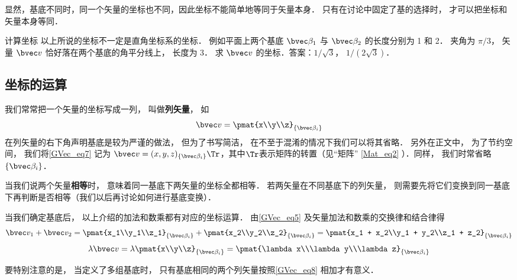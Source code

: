 显然，基底不同时，同一个矢量的坐标也不同，因此坐标不能简单地等同于矢量本身． 只有在讨论中固定了基的选择时， 才可以把坐标和矢量本身等同．

\begin{exercise}{计算坐标}
以上所说的坐标不一定是直角坐标系的坐标． 例如平面上两个基底 $\bvec \beta_1$ 与 $\bvec \beta_2$ 的长度分别为 1 和 2． 夹角为 $\pi/3$， 矢量 $\bvec v$ 恰好落在两个基底的角平分线上， 长度为 3． 求 $\bvec v$ 的坐标．答案：$1/\sqrt 3$， $1/(2\sqrt 3)$．
\end{exercise}

\subsection{坐标的运算}
我们常常把一个矢量的坐标写成一列， 叫做\textbf{列矢量}， 如
\begin{equation}\label{GVec_eq7}
\bvec v = \pmat{x\\y\\z}_{\{\bvec\beta_i\}}
\end{equation}
在列矢量的右下角声明基底是较为严谨的做法， 但为了书写简洁， 在不至于混淆的情况下我们可以将其省略． 另外在正文中， 为了节约空间， 我们将\autoref{GVec_eq7} 记为 $\bvec v = (x, y, z)_{\{\bvec\beta_i\}}\Tr$，其中$\Tr$表示矩阵的转置（见“矩阵” \autoref{Mat_eq2} ）．同样， 我们时常省略 $\{\bvec\beta_i\}$．

当我们说两个矢量\textbf{相等}时， 意味着同一基底下两矢量的坐标全都相等． 若两矢量在不同基底下的列矢量， 则需要先将它们变换到同一基底下再判断是否相等（我们以后再讨论如何进行基底变换）．

当我们确定基底后， 以上介绍的加法和数乘都有对应的坐标运算． 由\autoref{GVec_eq5} 及矢量加法和数乘的交换律和结合律得
\begin{equation}\label{GVec_eq8}
\bvec v_1 + \bvec v_2 = \pmat{x_1\\y_1\\z_1}_{\{\bvec\beta_i\}} + \pmat{x_2\\y_2\\z_2}_{\{\bvec\beta_i\}} = \pmat{x_1 + x_2\\y_1 + y_2\\z_1 + z_2}_{\{\bvec\beta_i\}}
\end{equation}
\begin{equation}\label{GVec_eq9}
\lambda \bvec v = \lambda\pmat{x\\y\\z}_{\{\bvec\beta_i\}} = \pmat{\lambda x\\\lambda y\\\lambda z}_{\{\bvec\beta_i\}}
\end{equation}

要特别注意的是， 当定义了多组基底时， 只有基底相同的两个列矢量按照\autoref{GVec_eq8} 相加才有意义．
